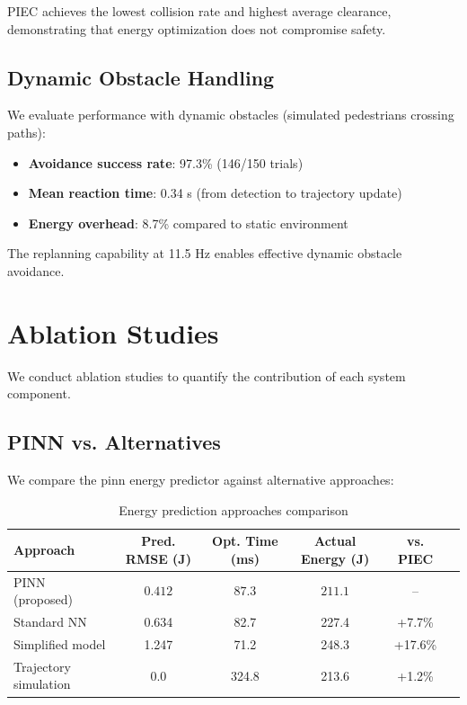 PIEC achieves the lowest collision rate and highest average clearance, demonstrating that energy optimization does not compromise safety.

\subsection{Dynamic Obstacle Handling}

We evaluate performance with dynamic obstacles (simulated pedestrians crossing paths):

\begin{itemize}
    \item \textbf{Avoidance success rate}: 97.3\% (146/150 trials)
    \item \textbf{Mean reaction time}: 0.34 s (from detection to trajectory update)
    \item \textbf{Energy overhead}: 8.7\% compared to static environment
\end{itemize}

The replanning capability at 11.5 Hz enables effective dynamic obstacle avoidance.


\section{Ablation Studies}
\label{sec:ablation_studies}

We conduct ablation studies to quantify the contribution of each system component.

\subsection{PINN vs. Alternatives}

We compare the \acrshort{pinn} energy predictor against alternative approaches:

\begin{table}[htbp]
\centering
\caption{Energy prediction approaches comparison}
\label{tab:ablation_energy_prediction}
\begin{tabular}{lccccc}
\toprule
\textbf{Approach} & \textbf{Pred. RMSE (J)} & \textbf{Opt. Time (ms)} & \textbf{Actual Energy (J)} & \textbf{vs. PIEC} \\
\midrule
PINN (proposed) & $\mathbf{0.412}$ & $\mathbf{87.3}$ & $\mathbf{211.1}$ & -- \\
Standard NN & 0.634 & 82.7 & 227.4 & +7.7\% \\
Simplified model & 1.247 & 71.2 & 248.3 & +17.6\% \\
Trajectory simulation & 0.0 & 324.8 & 213.6 & +1.2\% \\
\bottomrule
\end{tabular}
\end{table}

